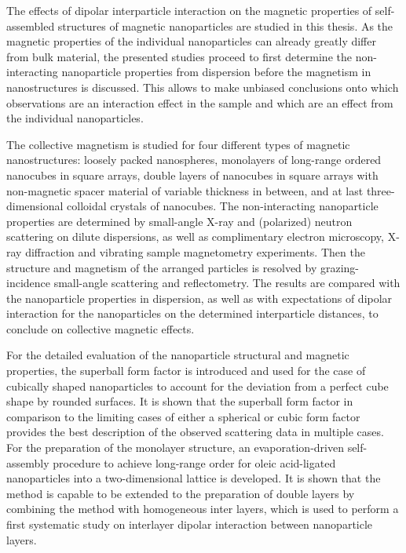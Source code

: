 \documentclass[\main/dresen_thesis.tex]{subfiles}
\begin{document}
  The effects of dipolar interparticle interaction on the magnetic properties of self-assembled structures of magnetic nanoparticles are studied in this thesis.
  As the magnetic properties of the individual nanoparticles can already greatly differ from bulk material, the presented studies proceed to first determine the non-interacting nanoparticle properties from dispersion before the magnetism in nanostructures is discussed.
  This allows to make unbiased conclusions onto which observations are an interaction effect in the sample and which are an effect from the individual nanoparticles.

  The collective magnetism is studied for four different types of magnetic nanostructures: loosely packed nanospheres, monolayers of long-range ordered nanocubes in square arrays, double layers of nanocubes in square arrays with non-magnetic spacer material of variable thickness in between, and at last three-dimensional colloidal crystals of nanocubes.
  The non-interacting nanoparticle properties are determined by small-angle X-ray and (polarized) neutron scattering on dilute dispersions, as well as complimentary electron microscopy, X-ray diffraction and vibrating sample magnetometry experiments.
  Then the structure and magnetism of the arranged particles is resolved by grazing-incidence small-angle scattering and reflectometry.
  The results are compared with the nanoparticle properties in dispersion, as well as with expectations of dipolar interaction for the nanoparticles on the determined interparticle distances, to conclude on collective magnetic effects.

  For the detailed evaluation of the nanoparticle structural and magnetic properties, the superball form factor is introduced and used for the case of cubically shaped nanoparticles to account for the deviation from a perfect cube shape by rounded surfaces.
  It is shown that the superball form factor in comparison to the limiting cases of either a spherical or cubic form factor provides the best description of the observed scattering data in multiple cases.
  For the preparation of the monolayer structure, an evaporation-driven self-assembly procedure to achieve long-range order for oleic acid-ligated nanoparticles into a two-dimensional lattice is developed.
  It is shown that the method is capable to be extended to the preparation of double layers by combining the method with homogeneous inter layers, which is used to perform a first systematic study on interlayer dipolar interaction between nanoparticle layers.
\end{document}

